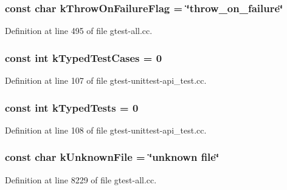 \hypertarget{namespacetesting_1_1internal_a2ada1f0b59f090f1791291c533c793f2}{
\subsubsection[{k\-Throw\-On\-Failure\-Flag}]{\setlength{\rightskip}{0pt plus 5cm}const char {\bf k\-Throw\-On\-Failure\-Flag} = \char`\"{}throw\-\_\-on\-\_\-failure\char`\"{}}}\label{d0/da7/namespacetesting_1_1internal_a2ada1f0b59f090f1791291c533c793f2}


\-Definition at line 495 of file gtest-\/all.\-cc.

\hypertarget{namespacetesting_1_1internal_aab6cd8451834790f97a7cb7f7f6ecf28}{
\subsubsection[{k\-Typed\-Test\-Cases}]{\setlength{\rightskip}{0pt plus 5cm}const int {\bf k\-Typed\-Test\-Cases} = 0}}\label{d0/da7/namespacetesting_1_1internal_aab6cd8451834790f97a7cb7f7f6ecf28}


\-Definition at line 107 of file gtest-\/unittest-\/api\-\_\-test.\-cc.

\hypertarget{namespacetesting_1_1internal_a36ce78fee501003e1b80acbb3d4ada2c}{
\subsubsection[{k\-Typed\-Tests}]{\setlength{\rightskip}{0pt plus 5cm}const int {\bf k\-Typed\-Tests} = 0}}\label{d0/da7/namespacetesting_1_1internal_a36ce78fee501003e1b80acbb3d4ada2c}


\-Definition at line 108 of file gtest-\/unittest-\/api\-\_\-test.\-cc.

\hypertarget{namespacetesting_1_1internal_a2fca93647e94e7b89bec4352991a5a6e}{
\subsubsection[{k\-Unknown\-File}]{\setlength{\rightskip}{0pt plus 5cm}const char {\bf k\-Unknown\-File} = \char`\"{}unknown file\char`\"{}}}\label{d0/da7/namespacetesting_1_1internal_a2fca93647e94e7b89bec4352991a5a6e}


\-Definition at line 8229 of file gtest-\/all.\-cc.

